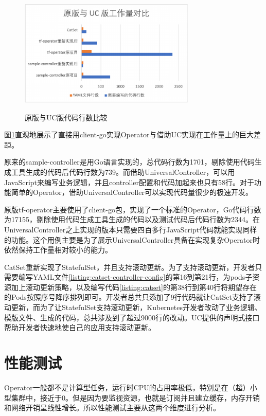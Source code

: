 \documentclass[macfonts,master]{njuthesis}
\begin{document}
\begin{figure}[htbp]
  \centering
  \includegraphics[width=0.75\textwidth]{pics/operator-line.pdf}\\
  \caption{原版与UC版代码行数比较}\label{fig:operator-cl}
\end{figure}

图\ref{fig:operator-cl}直观地展示了直接用client-go实现Operator与借助UC实现在工作量上的巨大差距。

原来的sample-controller是用Go语言实现的，总代码行数为1701，剔除使用代码生成工具生成的代码后代码行数为739。而借助UniversalController，可以用JavaScript来编写业务逻辑，并且controller配置和代码加起来也只有58行。对于功能简单的Operator，借助UniversalController可以实现代码量很少的极速开发。

原版tf-operator主要使用了client-go包，实现了一个标准的Operator，Go代码行数为17155，剔除使用代码生成工具生成的代码以及测试代码后代码行数为2344。在UniversalController之上实现的版本只需要四百多行JavaScript代码就能实现同样的功能。这个用例主要是为了展示UniversalController具备在实现复杂Operator时依然保持工作量相对较小的能力。

CatSet重新实现了StatefulSet，并且支持滚动更新。为了支持滚动更新，开发者只需要编写YAML文件\ref{listing:catset-controller-config}的第16到第21行，为pods子资源加上滚动更新策略，以及编写代码\ref{listing:catset}的第38行到第40行将期望存在的Pods按照序号降序排列即可。开发者总共只添加了9行代码就让CatSet支持了滚动更新，而为了让StatefulSet支持滚动更新，Kubernetes开发者改动了业务逻辑、模版文件、生成的代码，总共涉及到了超过9000行的改动\cite{statefulsetupdate}。UC提供的声明式接口帮助开发者快速地使自己的应用支持滚动更新。

\section{性能测试}

Operator一般都不是计算型任务，运行时CPU的占用率极低，特别是在（超）小型集群中，接近于0。但是因为要监视资源，也就是订阅并且建立缓存，内存开销和网络开销呈线性增长。所以性能测试主要从这两个维度进行分析。
\end{document}
